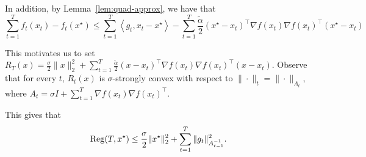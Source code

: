 \documentclass{article}
\DeclareMathOperator*{\Reg}{{\rm Reg}}
\newcommand{\inner}[2]{\left\langle #1,#2 \right\rangle}
\begin{document}
In addition, by Lemma~\ref{lem:quad-approx}, we have that
\[ \sum_{t=1}^T f_t(x_t) - f_t(x^\star) \leq \sum_{t=1}^T \inner{g_t}{x_t - x^\star} -  \sum_{t=1}^T \frac{\tilde{\alpha}}{2}(x^\star - x_t)^\top \nabla f(x_t) \nabla f(x_t)^\top (x^\star - x_t) \]

This motivates us to set $R_T(x) = \frac\sigma2 \|x\|_2^2 + \sum_{t=1}^T \frac{\tilde{\alpha}}{2}(x - x_t)^\top \nabla f(x_t) \nabla f(x_t)^\top (x - x_t)$. Observe that for every $t$, $R_t(x)$ is $\sigma$-strongly convex with respect to $\| \cdot \|_t = \| \cdot \|_{A_t}$, where $A_t = \sigma I + \sum_{t=1}^T \nabla f(x_t) \nabla f(x_t)^\top$.

This gives that
\[ \Reg(T, x^\star) \leq \frac\sigma2 \|x^\star\|_2^2 + \sum_{t=1}^T \| g_t \|_{A_{t-1}^{-1}}^2. \]
\end{document}
